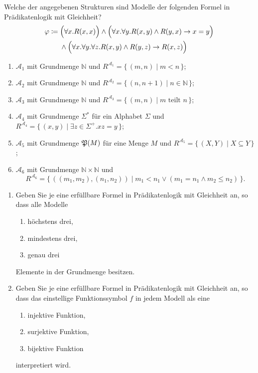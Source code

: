 \documentclass[german]{latteachCD}[2017/03/28]
\begin{document}
\clearpage

\begin{exercise}
  Welche der angegebenen Strukturen sind Modelle der folgenden Formel in
  Prädikatenlogik mit Gleichheit?
  \begin{align*}
    \phi \coloneqq{}& \Bigl(\forall x. R(x,x)\Bigr) \land \Bigl(\forall x. \forall y. R(x,y) \land
           R(y,x) \to x = y\Bigr)\\
    &\land \Bigl(\forall x. \forall y. \forall z. R(x,y) \land R(y,z)
      \to R(x,z)\Bigr)
  \end{align*}
  \begin{enumerate}
  \item $\mathcal{A}_{1}$ mit Grundmenge $\mathbb N$ und $R^{\mathcal{A}_{1}} =
    \{\,(m,n) \mid m < n \,\}$;
  \item $\mathcal{A}_{2}$ mit Grundmenge $\mathbb N$ und $R^{\mathcal{A}_{2}} =
    \{\,(n,n+1) \mid n \in \mathbb N \,\}$;
  \item $\mathcal{A}_{3}$ mit Grundmenge $\mathbb N$ und $R^{\mathcal{A}_{3}} =
    \{\,(m,n) \mid m \text{ teilt } n\,\}$;
  \item $\mathcal{A}_{4}$ mit Grundmenge $\Sigma^{*}$ für ein Alphabet $\Sigma$
    und $R^{\mathcal{A}_{4}} = \{\,(x,y) \mid \exists z \in \Sigma^{+}. xz =
    y\,\}$;
  \item $\mathcal{A}_{5}$ mit Grundmenge $\subsets{M}$ für eine Menge $M$ und
    $R^{\mathcal{A}_{5}} = \{\,(X,Y) \mid X \subseteq Y\,\}$;
  \item $\mathcal{A}_{6}$ mit Grundmenge $\mathbb N \times \mathbb N$ und
    \begin{equation*}
      R^{\mathcal{A}_{6}} = \{\,((m_{1},m_{2}),(n_{1},n_{2})) \mid m_{1} < n_{1}
      \lor (m_{1} = n_{1} \land m_{2} \leq n_{2})\,\}.
    \end{equation*}
  \end{enumerate}
\end{exercise}

\begin{exercise}
  \begin{enumerate}
  \item Geben Sie je eine erfüllbare Formel in Prädikatenlogik mit Gleichheit
    an, so dass alle Modelle
    \begin{enumerate}
    \item höchstens drei,
    \item mindestens drei,
    \item genau drei
    \end{enumerate}
    Elemente in der Grundmenge besitzen.
  \item Geben Sie je eine erfüllbare Formel in Prädikatenlogik mit Gleichheit
    an, so dass das einstellige Funktionssymbol $f$ in jedem Modell als eine
    \begin{enumerate}
    \item injektive Funktion,
    \item surjektive Funktion,
    \item bijektive Funktion
    \end{enumerate}
    interpretiert wird.
  \end{enumerate}
\end{exercise}
\end{document}
